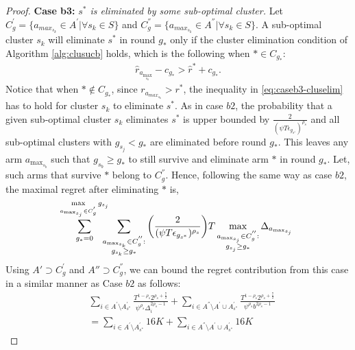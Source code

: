 \begin{proof}
\textbf{Case b3:} \textit{$s^{*}$ is eliminated by some sub-optimal cluster.} 
Let $C_{g}^{'}=\lbrace a_{max_{s_{k}}}\in A^{'}|\forall s_{k}\in S \rbrace$ and $C_{g}^{''}=\lbrace a_{max_{s_{k}}}\in A^{''}|\forall s_{k}\in S \rbrace$. A sub-optimal cluster $s_k$ will eliminate $s^*$ in round $g_*$ only if the cluster elimination condition of Algorithm \ref{alg:clusucb} holds, which is the following when ${*}\in C_{g_{*}}$:
\begin{align}
\hat r_{a_{\max_{s_k}}} - c_{g_*} > \hat{r}^{*}+ c_{g_*}.
\label{eq:caseb3-cluselim}
\end{align}
Notice that when ${*}\notin C_{g_{*}}$, since $r_{a_{max_{s_{k}}}}>r^{*}$, the inequality in \eqref{eq:caseb3-cluselim} has to hold for cluster $s_k$ to eliminate $s^*$.
As in case $b2$, the probability that a given sub-optimal cluster $s_k$ eliminates $s^*$ is upper bounded by  $\frac{2}{(\psi T\epsilon_{g_{s^{*}}})^{\rho_{s}}}$ and all sub-optimal clusters with $g_{s_{j}}< g_{*}$ are eliminated before round $g_*$. This leaves any arm $a_{\max_{s_{b}}}$ such that $g_{s_{b}}\geq g_{*}$ to still survive and eliminate arm ${*}$ in round $g_{*}$. Let, such arms that survive ${*}$ belong to $C_{g}^{''}$. Hence, following the same way as case $b2$,  the maximal regret after eliminating ${*}$ is,
 \begin{align*}
 \!\!\sum_{g_{*}=0}^{\max\limits_{a_{\max_{s_{j}}}\in C_{g}^{'}}g_{s_{j}}}\!\!\!\!\!\sum_{\substack{\scriptsize a_{\max_{s_{k}}}\in C_{g}^{''}: \\ g_{s_{k}} \geq g_{*}}}\bigg(\dfrac{2}{(\psi T\epsilon_{g_{s^{*}}})^{\rho_{s}}} \bigg)T\max_{\substack{a_{\max_{s_{j}}}\in C_{g}^{''}: \\ g_{s_{j}}\geq g_{*}}}{\Delta}_{a_{\max_{s_{j}}}}
 \end{align*}
Using $A'\supset C_{g}^{'}$ and $A''\supset C_{g}^{''}$, we can bound the regret contribution from this case in a similar manner as Case $b2$ as follows:
\begin{align*}
 &\!\!\sum_{i\in A^{'}\setminus A_{s^*}^{'}}\frac{T^{1-\rho_{s}}2^{\rho_{s}+\frac{7}{2}}}{\psi^{\rho_{s}}\Delta_{i}^{2\rho_{s}-1}} 
 \!+\!\!\!\sum_{i\in A^{''}\setminus A^{'}\cup A_{s^*}^{'}}\!\!\!\!\frac{T^{1-\rho_{s}}2^{\rho_{s}+\frac{7}{2}}}{\psi^{\rho_{s}}b^{2\rho_{s}-1}} \\
 & = \sum_{i\in A^{'}\setminus A_{s^*}^{'}} 16K +\sum_{i\in A^{''}\setminus A^{'}\cup A_{s^*}^{'}} 16K
\end{align*}


\end{proof}
